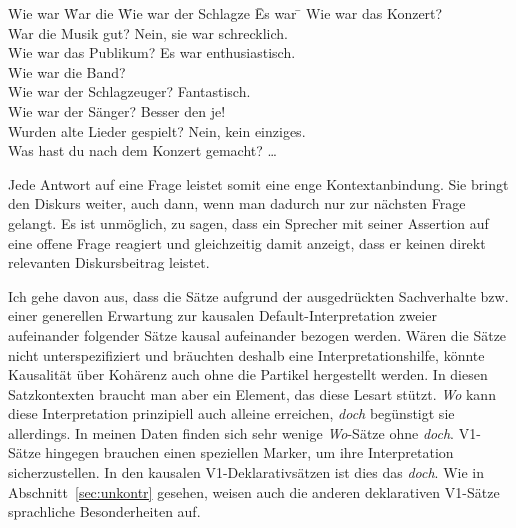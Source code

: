 {\begin{exe}
        \ex \label{1035b}
        \begin{tabbing}
        Wie war \= War die \= Wie war der Schlagze \= Es war \= \kill
        Wie war das Konzert?\\
                \> War die Musik gut?                \>\> Nein, sie war schrecklich.\\
                \> Wie war das Publikum?        \>\> Es war enthusiastisch.\\       
                \> Wie war die Band?\\
                        \>\> Wie war der Schlagzeuger?        \>\> Fantastisch.\\
                        \>\> Wie war der Sänger?        \>\> Besser den je!\\
                \> Wurden alte Lieder gespielt? \>\> Nein, kein einziges.\\
        Was hast du nach dem Konzert gemacht? \ldots
        \end{tabbing}
\end{exe}
Jede Antwort auf eine \glq Frage\grq {} leistet somit eine enge Kontextanbindung. Sie bringt den Diskurs weiter, auch dann, wenn man dadurch nur zur nächsten Frage gelangt. Es ist unmöglich, zu sagen, dass ein Sprecher mit seiner Assertion auf eine offene Frage reagiert und gleichzeitig damit anzeigt, dass er keinen direkt relevanten Diskursbeitrag leistet.

Ich gehe davon aus, dass die Sätze aufgrund der ausgedrückten Sachverhalte bzw. einer generellen Erwartung zur kausalen Default-Interpretation zweier auf\-einander folgender Sätze kausal aufeinander bezogen werden. Wären die Sätze nicht unterspezifiziert und bräuchten deshalb eine Interpretationshilfe, könnte Kausa\-lität über Kohärenz auch ohne die Partikel hergestellt werden. In diesen Satzkontexten braucht man aber ein Element, das diese Lesart stützt. \textit{Wo} kann diese Interpretation prinzipiell auch alleine erreichen, \textit{doch} begünstigt sie allerdings. In meinen Daten finden sich sehr wenige \textit{Wo}-Sätze ohne \textit{doch}. V1-Sätze hingegen brauchen einen speziellen Marker, um ihre Interpretation sicherzustellen. In den kausalen V1-Deklarativsätzen ist dies das \textit{doch}. Wie in Abschnitt~\ref{sec:unkontr} gesehen, weisen auch die anderen deklarativen V1-Sätze sprachliche Besonderheiten auf. 

}
